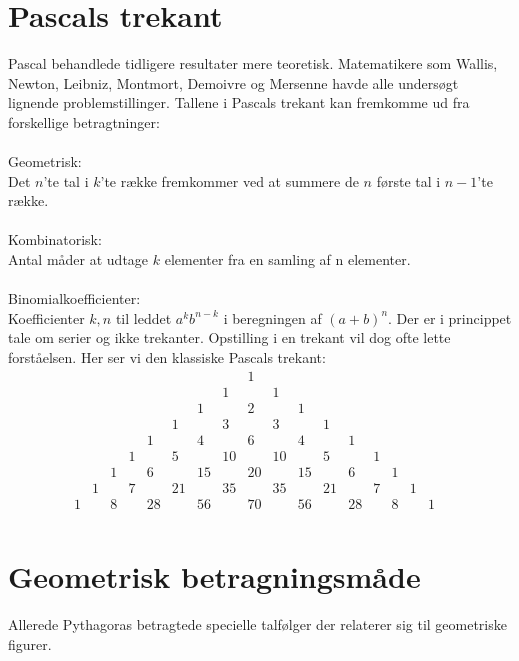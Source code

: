 
\section{Pascals trekant}
Pascal behandlede tidligere resultater mere teoretisk. Matematikere som Wallis, Newton, Leibniz, Montmort, Demoivre og Mersenne havde alle undersøgt lignende problemstillinger.
Tallene i Pascals trekant kan fremkomme ud fra forskellige betragtninger:\\\\
Geometrisk:\\
Det \(n\)'te tal i \(k\)'te række fremkommer ved at summere de \(n\) første tal i \(n-1\)'te række.\\\\
Kombinatorisk:\\
Antal måder at udtage \(k\) elementer fra en samling af n elementer.\\\\
Binomialkoefficienter:\\
Koefficienter \(k,n\) til leddet \(a^{k}b^{n-k}\) i beregningen af \((a+b)^{n}\).
Der er i princippet tale om serier og ikke trekanter. Opstilling i en trekant vil dog ofte lette forståelsen.
Her ser vi den klassiske Pascals trekant:
\begin{equation*}
\begin{array}{lllllllllllllllllll}
&&&&&&&&1&&&&&&&&&\\
&&&&&&&1&&1&&&&&&&&\\
&&&&&&1&&2&&1&&&&&&&\\
&&&&&1&&3&&3&&1&&&&&&\\
&&&&1&&4&&6&&4&&1&&&&&\\
&&&1&&5&&10&&10&&5&&1&&&&\\
&&1&&6&&15&&20&&15&&6&&1&&&\\
&1&&7&&21&&35&&35&&21&&7&&1&&\\
1&&8&&28&&56&&70&&56&&28&&8&&1\\
\end{array}
\end{equation*}
\section{Geometrisk betragningsmåde}
Allerede Pythagoras betragtede specielle talfølger der relaterer sig til geometriske figurer.
